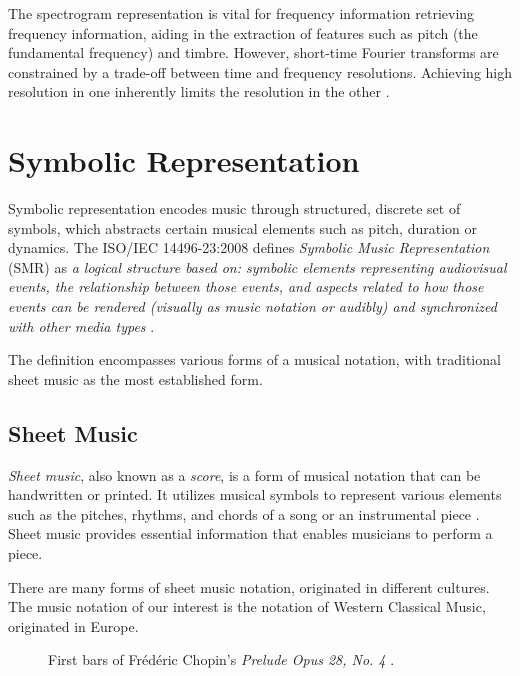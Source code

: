 The spectrogram representation is vital for frequency information retrieving frequency information, aiding in the extraction of features such as pitch (the fundamental frequency) and timbre. However, short-time Fourier transforms are constrained by a trade-off between time and frequency resolutions. Achieving high resolution in one inherently limits the resolution in the other \cite[p.~365--366]{Smith1999}.

\section{Symbolic Representation}

Symbolic representation encodes music through structured, discrete set of symbols, which abstracts certain musical elements such as pitch, duration or dynamics. The ISO/IEC 14496-23:2008 defines \emph{Symbolic Music Representation} (SMR) as \emph{a logical structure based on: symbolic elements representing audiovisual events, the relationship between those events, and aspects related to how those events can be rendered (visually as music notation or audibly) and synchronized with other media types} \cite{ISO2008}.

The definition encompasses various forms of a musical notation, with traditional sheet music as the most established form.

\subsection{Sheet Music}

\emph{Sheet music}, also known as a \emph{score}, is a form of musical notation that can be handwritten or printed. It utilizes musical symbols to represent various elements such as the pitches, rhythms, and chords of a song or an instrumental piece \cite{Wiki2024B}. Sheet music provides essential information that enables musicians to perform a piece.

There are many forms of sheet music notation, originated in different cultures. The music notation of our interest is the notation of Western Classical Music, originated in Europe.

\begin{figure}[ht!]
\centering

\caption[First bars of Frédéric Chopin's \emph{Prelude Opus 28, No. 4}.]{First bars of Frédéric Chopin's \emph{Prelude Opus 28, No. 4} \cite{Chopin1839}.}
\label{prelude_opus_28_4}
\end{figure}

